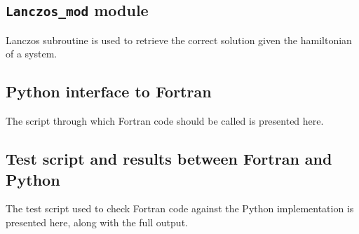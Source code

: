 \documentclass[a4paper,11pt]{article}
\begin{document}
\begin{appendices}


\subsection{\texttt{Lanczos\_mod} module}

Lanczos subroutine is used to retrieve the correct solution given the hamiltonian of a system.



\subsection{Python interface to Fortran}
The script through which Fortran code should be called is presented here.



\subsection{Test script and results between Fortran and Python}

The test script used to check Fortran code against the Python implementation is presented here, along with the full output.







\end{appendices}

\end{document}
